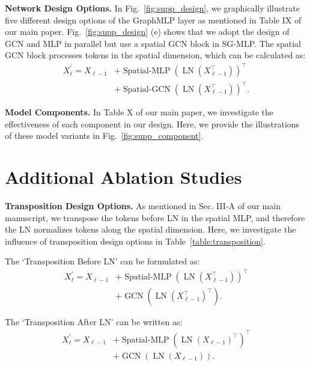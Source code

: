 \documentclass[lettersize,journal]{IEEEtran}
\begin{document}
\noindent \textbf{Network Design Options.}
In Fig.~\ref{fig:supp_design}, we graphically illustrate five different design options of the GraphMLP layer as mentioned in Table IX of our main paper. 
Fig.~\ref{fig:supp_design} (e) shows that we adopt the design of GCN and MLP in parallel but use a spatial GCN block in SG-MLP. 
The spatial GCN block processes tokens in the spatial dimension, which can be calculated as:
\begin{equation}
  \begin{aligned}
  X^{\prime}_{\ell} = X_{\ell-1} &+ \operatorname{Spatial-MLP}(\operatorname{LN}(X_{\ell-1}^{\top}))^{\top} \\
  & + \operatorname{Spatial-GCN}(\operatorname{LN}({X_{\ell-1}^{\top}}))^{\top}.
\end{aligned}
\end{equation}

\noindent \textbf{Model Components.}
In Table X of our main paper, we investigate the effectiveness of each component in our design. 
Here, we provide the illustrations of these model variants in Fig.~\ref{fig:supp_component}. 

\section{Additional Ablation Studies}
\label{sec:ablation}
\noindent \textbf{Transposition Design Options.}
As mentioned in Sec. III-A of our main manuscript, we transpose the tokens before LN in the spatial MLP, and therefore the LN normalizes tokens along the spatial dimension. 
Here, we investigate the influence of transposition design options in Table~\ref{table:transposition}. 

The `Transposition Before LN' can be formulated as:
\begin{equation}
  \begin{aligned}
  X^{\prime}_{\ell} = X_{\ell-1} &+ \operatorname{Spatial-MLP}(\operatorname{LN}(X_{\ell-1}^{\top}))^{\top} \\
  & + \operatorname{GCN}(\operatorname{LN}({X_{\ell-1}^{\top}})^{\top}). 
\end{aligned}
\end{equation}

The `Transposition After LN' can be written as:
\begin{equation}
  \begin{aligned}
  X^{\prime}_{\ell} = X_{\ell-1} &+ \operatorname{Spatial-MLP}(\operatorname{LN}(X_{\ell-1})^{\top})^{\top} \\
  & + \operatorname{GCN}(\operatorname{LN}({X_{\ell-1}})). 
\end{aligned}
\end{equation}
\end{document}
